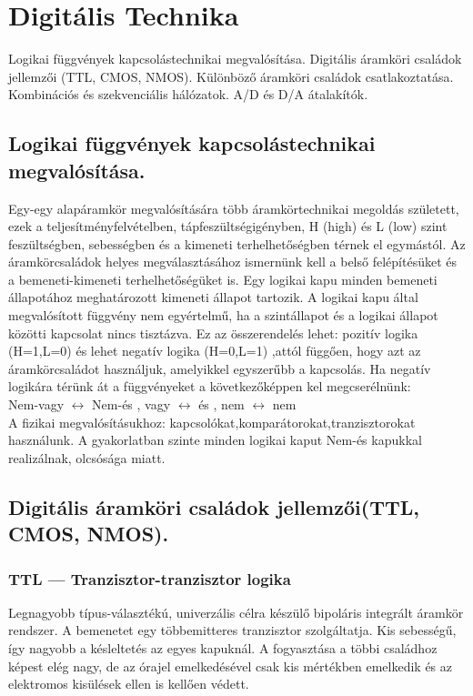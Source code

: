 \section{Digitális Technika}
{\footnotesize Logikai függvények kapcsolástechnikai megvalósítása. Digitális áramköri családok jellemzői (TTL, CMOS, NMOS). Különböző áramköri családok csatlakoztatása. Kombinációs és szekvenciális hálózatok. A/D és D/A átalakítók.}
\subsection{Logikai függvények kapcsolástechnikai megvalósítása.}
Egy-egy alapáramkör megvalósítására több áramkörtechnikai megoldás született, ezek a teljesítményfelvételben, tápfeszültségigényben, H (high) és L (low) szint feszültségben, sebességben és a kimeneti terhelhetőségben térnek el egymástól. Az áramkörcsaládok helyes megválasztásához ismernünk kell a belső felépítésüket és a bemeneti-kimeneti terhelhetőségüket is. Egy logikai kapu minden bemeneti állapotához meghatározott kimeneti állapot tartozik. A logikai kapu által megvalósított függvény nem egyértelmű, ha a szintállapot és a logikai állapot közötti kapcsolat nincs tisztázva. Ez az összerendelés lehet: pozitív logika (H=1,L=0) és lehet negatív logika (H=0,L=1) ,attól függően, hogy azt az áramkörcsaládot használjuk, amelyikkel egyszerűbb a kapcsolás. Ha negatív logikára térünk át a függvényeket a következőképpen kel megcserélnünk:\\
Nem-vagy $\leftrightarrow$ Nem-és , vagy $\leftrightarrow$ és , nem $\leftrightarrow$ nem\\ 
A fizikai megvalósításukhoz: kapcsolókat,komparátorokat,tranzisztorokat használunk. A gyakorlatban szinte minden logikai kaput Nem-és kapukkal realizálnak, olcsósága miatt.

\subsection{Digitális áramköri családok jellemzői(TTL, CMOS, NMOS).}
\subsubsection{TTL --- Tranzisztor-tranzisztor logika}
Legnagyobb típus-választékú, univerzális célra készülő bipoláris integrált áramkör rendszer. A bemenetet egy többemitteres tranzisztor szolgáltatja. Kis sebességű, így nagyobb a késleltetés az egyes kapuknál. A fogyasztása a többi családhoz képest elég nagy, de az órajel emelkedésével csak kis mértékben emelkedik és az elektromos kisülések ellen is kellően védett. 

